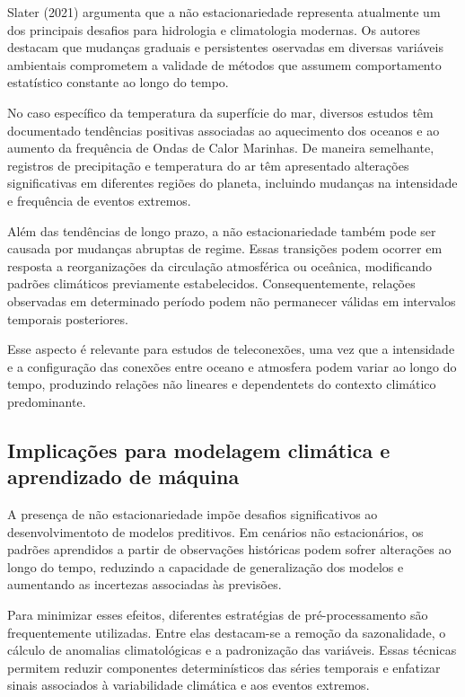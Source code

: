	Slater (2021) argumenta que a não estacionariedade representa atualmente um dos principais desafios para hidrologia e climatologia modernas.
	Os autores destacam que mudanças graduais e persistentes oservadas em diversas variáveis ambientais comprometem a validade de métodos que assumem comportamento estatístico constante ao longo do tempo.

	No caso específico da temperatura da superfície do mar, diversos estudos têm documentado tendências positivas associadas ao aquecimento dos oceanos e ao aumento da frequência de Ondas de Calor Marinhas.
	De maneira semelhante, registros de precipitação e temperatura do ar têm apresentado alterações significativas em diferentes regiões do planeta, incluindo mudanças na intensidade e frequência de eventos extremos.

	Além das tendências de longo prazo, a não estacionariedade também pode ser causada por mudanças abruptas de regime.
	Essas transições podem ocorrer em resposta a reorganizações da circulação atmosférica ou oceânica, modificando padrões climáticos previamente estabelecidos.
	Consequentemente, relações observadas em determinado período podem não permanecer válidas em intervalos temporais posteriores.

	Esse aspecto é relevante para estudos de teleconexões, uma vez que a intensidade e a configuração das conexões entre oceano e atmosfera podem variar ao longo do tempo, produzindo relações não lineares e dependentets do contexto climático predominante.


\subsection{Implicações para modelagem climática e aprendizado de máquina}\label{sec:implicacoes-modelagem-aprendizado}

	A presença de não estacionariedade impõe desafios significativos ao desenvolvimentoto de modelos preditivos.
	Em cenários não estacionários, os padrões aprendidos a partir de observações históricas podem sofrer alterações ao longo do tempo, reduzindo a capacidade de generalização dos modelos e aumentando as incertezas associadas às previsões.

	Para minimizar esses efeitos, diferentes estratégias de pré-processamento são frequentemente utilizadas. Entre elas destacam-se a remoção da sazonalidade, o cálculo de anomalias climatológicas e a padronização das variáveis.
	Essas técnicas permitem reduzir componentes determinísticos das séries temporais e enfatizar sinais associados à variabilidade climática e aos eventos extremos.

